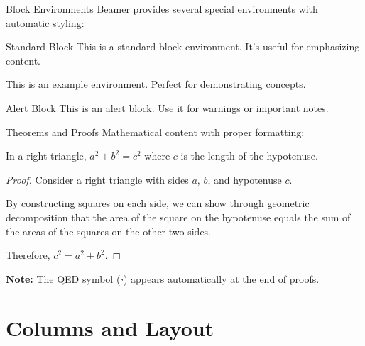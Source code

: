 \documentclass[aspectratio=169]{beamer}
\begin{document}
\begin{frame}{Block Environments}
  Beamer provides several special environments with automatic styling:
  
  \begin{block}{Standard Block}
    This is a standard block environment. It's useful for emphasizing content.
  \end{block}
  
  \begin{example}
    This is an example environment. Perfect for demonstrating concepts.
  \end{example}
  
  \begin{alertblock}{Alert Block}
    This is an alert block. Use it for warnings or important notes.
  \end{alertblock}
\end{frame}

\begin{frame}{Theorems and Proofs}
  Mathematical content with proper formatting:
  
  \begin{theorem}
    In a right triangle, $a^2 + b^2 = c^2$ where $c$ is the length of the hypotenuse.
  \end{theorem}
  
  \begin{proof}
    Consider a right triangle with sides $a$, $b$, and hypotenuse $c$.
    
    By constructing squares on each side, we can show through geometric decomposition that the area of the square on the hypotenuse equals the sum of the areas of the squares on the other two sides.
    
    Therefore, $c^2 = a^2 + b^2$.
  \end{proof}
  
  \textbf{Note:} The QED symbol ($\square$) appears automatically at the end of proofs.
\end{frame}

\section{Columns and Layout}
\end{document}
